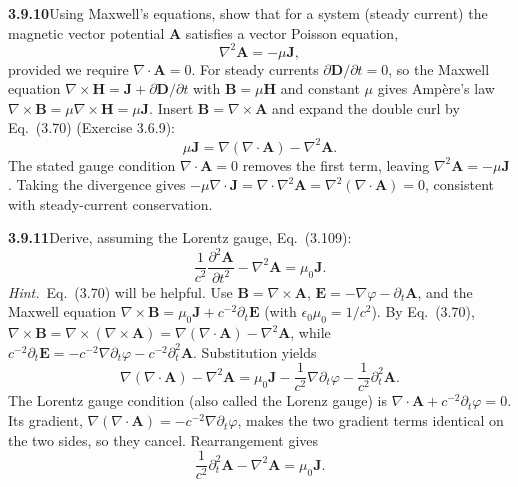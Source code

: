 \par\bigskip
\noindent\textbf{3.9.10}\quad Using Maxwell's equations, show that for a
system (steady current) the magnetic vector potential $\mathbf{A}$ satisfies a
vector Poisson equation,
\[
\nabla^{2}\mathbf{A}=-\mu\mathbf{J},
\]
provided we require $\nabla\cdot\mathbf{A}=0$.
\solution
{}
For steady currents $\partial\mathbf D/\partial t=0$, so the Maxwell
equation $\nabla\times\mathbf H=\mathbf J+\partial\mathbf D/\partial t$
with $\mathbf B=\mu\mathbf H$ and constant $\mu$ gives Amp\`ere's law
$\nabla\times\mathbf B=\mu\nabla\times\mathbf H=\mu\mathbf J$.
Insert $\mathbf B=\nabla\times\mathbf A$ and expand the double curl by
Eq.~(3.70) (Exercise 3.6.9):
\[
\mu\mathbf J=\nabla(\nabla\cdot\mathbf A)-\nabla^2\mathbf A.
\]
The stated gauge condition $\nabla\cdot\mathbf A=0$ removes the
first term, leaving $\boxed{\nabla^2\mathbf A=-\mu\mathbf J}$.
Taking the divergence gives
$-\mu\nabla\cdot\mathbf J=\nabla\cdot\nabla^2\mathbf A
=\nabla^2(\nabla\cdot\mathbf A)=0$, consistent with steady-current
conservation.

\par\bigskip
\noindent\textbf{3.9.11}\quad Derive, assuming the Lorentz gauge, Eq.~(3.109):
\[
\frac{1}{c^{2}}\frac{\partial^{2}\mathbf{A}}{\partial t^{2}}
-\nabla^{2}\mathbf{A}=\mu_{0}\mathbf{J}.
\]
\emph{Hint.}~Eq.~(3.70) will be helpful.
\solution
Use $\mathbf B=\nabla\times\mathbf A$,
$\mathbf E=-\nabla\varphi-\partial_t\mathbf A$, and the Maxwell equation
$\nabla\times\mathbf B=\mu_0\mathbf J+c^{-2}\partial_t\mathbf E$
(with $\epsilon_0\mu_0=1/c^2$). By Eq.~(3.70),
$\nabla\times\mathbf B=\nabla\times(\nabla\times\mathbf A)
=\nabla(\nabla\cdot\mathbf A)-\nabla^2\mathbf A$, while
$c^{-2}\partial_t\mathbf E=-c^{-2}\nabla\partial_t\varphi
-c^{-2}\partial_t^2\mathbf A$. Substitution yields
\[
\nabla(\nabla\cdot\mathbf A)-\nabla^2\mathbf A
=\mu_0\mathbf J-\frac1{c^2}\nabla\partial_t\varphi
-\frac1{c^2}\partial_t^2\mathbf A.
\]
The Lorentz gauge condition (also called the Lorenz gauge) is
$\nabla\cdot\mathbf A+c^{-2}\partial_t\varphi=0$.
Its gradient, $\nabla(\nabla\cdot\mathbf A)
=-c^{-2}\nabla\partial_t\varphi$, makes the two gradient terms
identical on the two sides, so they cancel.
Rearrangement gives
\[
\boxed{\frac1{c^2}\partial_t^2\mathbf A-\nabla^2\mathbf A
=\mu_0\mathbf J}.
\]

